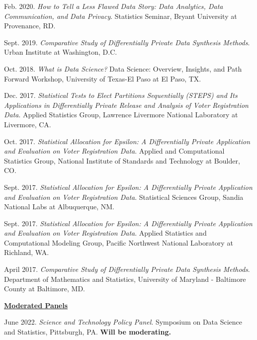 \documentclass[11pt, letterpaper, roman]{moderncv} %
\begin{document}
\begin{etaremune}[topsep=0pt, itemsep=4pt, partopsep=0pt, parsep=0pt]
    \item Feb. 2020. \textit{How to Tell a Less Flawed Data Story: Data Analytics, Data Communication, and Data Privacy}. Statistics Seminar, Bryant University at Provenance, RD.
    
    \item Sept. 2019. \textit{Comparative Study of Differentially Private Data Synthesis Methods}. Urban Institute at Washington, D.C.
    
    \item Oct. 2018. \textit{What is Data Science?} Data Science: Overview, Insights, and Path Forward Workshop, University of Texas-El Paso at El Paso, TX.
    
    \item Dec. 2017. \textit{Statistical Tests to Elect Partitions Sequentially (STEPS) and Its Applications in Differentially Private Release and Analysis of Voter Registration Data}. Applied Statistics Group, Lawrence Livermore National Laboratory at Livermore, CA.
    
    \item Oct. 2017. \textit{Statistical Allocation for Epsilon: A Differentially Private Application and Evaluation on Voter Registration Data}. Applied and Computational Statistics Group, National Institute of Standards and Technology at Boulder, CO.
    
    \item Sept. 2017. \textit{Statistical Allocation for Epsilon: A Differentially Private Application and Evaluation on Voter Registration Data}. Statistical Sciences Group, Sandia National Labs at Albuquerque, NM.
    
    \item Sept. 2017. \textit{Statistical Allocation for Epsilon: A Differentially Private Application and Evaluation on Voter Registration Data}. Applied Statistics and Computational Modeling Group, Pacific Northwest National Laboratory at Richland, WA.
    
    \item April 2017. \textit{Comparative Study of Differentially Private Data Synthesis Methods}. Department of Mathematics and Statistics, University of Maryland - Baltimore County at Baltimore, MD.
    
\vspace{6pt}
\hspace{-0.30in}\underline{\textbf{\large Moderated Panels}}\normalsize
    \item June 2022. \textit{Science and Technology Policy Panel}. Symposium on Data Science and Statistics, Pittsburgh, PA. \textbf{Will be moderating.}
    

\end{etaremune}
\end{document}
